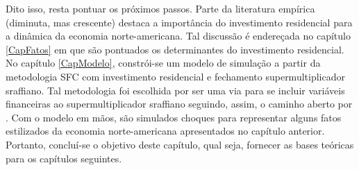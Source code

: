 Dito isso, resta pontuar os próximos passos.
Parte da literatura empírica (diminuta, mas crescente) destaca a importância do investimento residencial para a dinâmica da economia norte-americana. 
Tal discussão é endereçada no capítulo \ref{CapFatos} em que são pontuados os determinantes do investimento residencial.
No capítulo \ref{CapModelo},  
constrói-se um modelo de simulação a partir da metodologia SFC com investimento residencial e fechamento supermultiplicador sraffiano. Tal metodologia foi escolhida por ser uma via para se incluir variáveis financeiras ao supermultiplicador sraffiano seguindo, assim, o caminho aberto por \textcite{brochier_supermultiplier_2018}.
Com o modelo em mãos, são simulados choques para representar alguns fatos estilizados da economia norte-americana apresentados no capítulo anterior.
Portanto, concluí-se o objetivo deste capítulo, qual seja, fornecer as bases teóricas para os capítulos seguintes.


